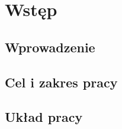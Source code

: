 \chapter{Wstęp}

\section{Wprowadzenie}
\sectionanchor

\section{Cel i zakres pracy}
\sectionanchor

\section{Układ pracy}
\sectionanchor
